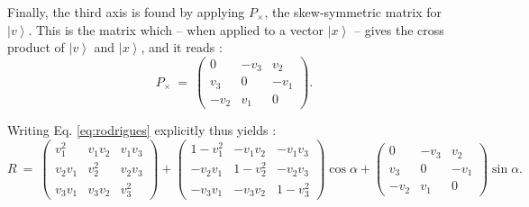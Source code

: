 Finally, the third axis is found by applying $P_{\times}$, the skew-symmetric matrix for $\left|v\right>$.
This is the matrix which -- when applied to a vector $\left|x\right>$ -- gives the cross product of $\left|v\right>$ and $\left|x\right>$, 
and it reads \cite{wiki_skewsymm}:
\begin{equation}
	P_{\times} \ =\ 
		\left( \begin{array}{ccc} 
			0       & -v_3 &  v_2 \\
			v_3   & 0      & -v_1 \\
			-v_2  & v_1  & 0
		\end{array} \right).
\end{equation}

Writing Eq. \ref{eq:rodrigues} explicitly thus yields \cite[p. 718, p. 816]{Arens2015}:
\begin{equation}
	R \ = \ 
		\left( \begin{array}{ccc} 
			v_1^2    &    v_1 v_2 &       v_1 v_3 \\
			v_2 v_1 &       v_2^2 &       v_2 v_3 \\
			v_3 v_1 &    v_3 v_2 &          v_3^2
		\end{array} \right)
	+ 	\left( \begin{array}{ccc} 
			1 - v_1^2    &      - v_1 v_2 &         - v_1 v_3 \\
			   - v_2 v_1 &      1 - v_2^2 &         - v_2 v_3 \\
			   - v_3 v_1 &      - v_3 v_2 &         1 - v_3^2
		\end{array} \right)
		\cos \alpha 
	 + 
		\left( \begin{array}{ccc} 
			0       & -v_3 &  v_2 \\
			v_3   & 0      & -v_1 \\
			-v_2  & v_1  & 0
		\end{array} \right)
		\sin \alpha.
	\label{eq:rodrigues}
\end{equation}

